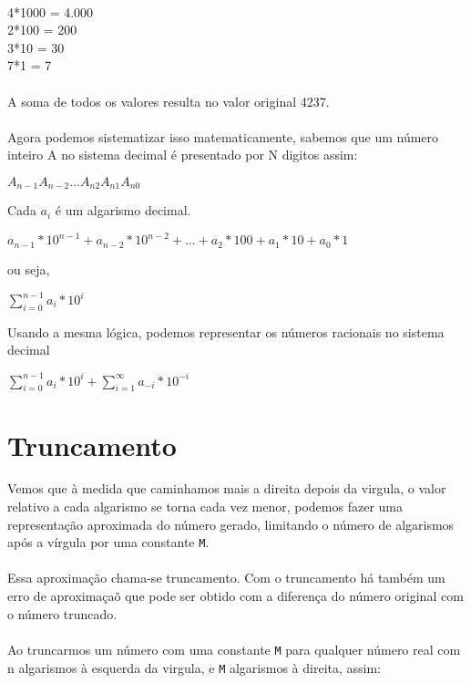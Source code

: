\documentclass[12pt, onecolumn]{article}
\begin{document}
	\\
	4*1000 	= 4.000\\
	2*100 	= 200\\
	3*10	= 30\\
	7*1	= 7\\
	\\
	A soma de todos os valores resulta no valor original 4237.\\
	\\
	Agora podemos sistematizar isso matematicamente, sabemos que um número
	inteiro A no sistema decimal é presentado por N digitos assim:\\
	\begin{center}
		$A_{n-1} A_{n-2} ... A_{n2} A_{n1} A_{n0}$
	\end{center}
	Cada $a_{i}$ é um algarismo decimal.

	\begin{center}
		$a_{n-1}*10^{n-1} + a_{n-2}*10^{n-2}+ ... + 
		a_{2}*100 + a_{1} * 10 + a_{0} * 1$
	\end{center}

	ou seja,

	\begin{center}
		$\sum_{i = 0}^{n - 1} a_{i} * 10^{i}$
	\end{center}

	Usando a mesma lógica, podemos representar os números racionais no sistema
	decimal
	
	\begin{center}
		$\sum_{i = 0}^{n - 1} a_{i} * 10^{i} + 
		\sum_{i = 1}^{\infty} a_{-i} * 10^{-i}$
	\end{center}

	\section{Truncamento}
	Vemos que à medida que caminhamos mais a direita depois da virgula, o
	valor relativo a cada algarismo se torna cada vez menor, podemos
	fazer uma representação aproximada do número gerado, limitando 
	o número de algarismos após a vírgula por uma constante \texttt{M}.\\
	\\
	Essa aproximação chama-se truncamento. Com o truncamento há também
	um erro de aproximaçaõ que pode ser obtido com a diferença do número original
	com o número truncado.\\
	\\
	Ao truncarmos um número com uma constante \texttt{M} para qualquer 
	número real com n algarismos à esquerda da virgula, 
	e \texttt{M} algarismos à direita, assim: 
\end{document}
